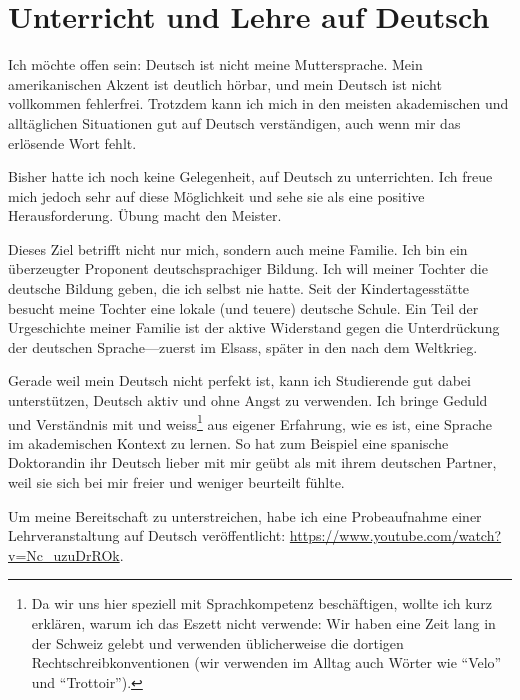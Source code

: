 
\section{Unterricht und Lehre auf Deutsch}

Ich m\"ochte offen sein: Deutsch ist nicht meine Muttersprache. Mein
amerikanischen Akzent
ist deutlich h\"orbar, und mein Deutsch ist nicht vollkommen
fehlerfrei.
%
Trotzdem kann ich mich in den meisten akademischen und allt\"aglichen
Situationen gut auf Deutsch verst\"andigen, auch wenn mir das
erl\"osende Wort fehlt.

Bisher hatte ich noch keine Gelegenheit, auf Deutsch zu
unterrichten. Ich freue mich jedoch sehr auf diese M\"oglichkeit und sehe
sie als eine positive Herausforderung.
\"Ubung macht den Meister.

Dieses Ziel betrifft nicht nur mich, sondern auch meine Familie.
Ich bin ein \"uberzeugter Proponent deutschsprachiger Bildung.
Ich will meiner Tochter die deutsche Bildung geben, die ich selbst nie
hatte.
Seit der Kindertagesst\"atte besucht meine Tochter eine lokale (und
teuere) deutsche
Schule.
Ein Teil der Urgeschichte meiner Familie ist der aktive
Widerstand gegen die Unterdr\"uckung der deutschen Sprache---zuerst im
Elsass, sp\"ater in den  nach dem Weltkrieg.

Gerade weil mein Deutsch nicht perfekt ist, kann ich Studierende gut
dabei unterst\"utzen, Deutsch aktiv und ohne Angst zu verwenden.
Ich bringe Geduld und Verst\"andnis mit und weiss\footnote{Da wir uns hier speziell mit Sprachkompetenz besch\"aftigen, wollte ich kurz erkl\"aren, warum ich das Eszett nicht verwende: Wir haben eine Zeit lang in der Schweiz gelebt und verwenden \"ublicherweise die dortigen Rechtschreibkonventionen (wir verwenden im Alltag auch W\"orter wie ``Velo'' und ``Trottoir'').} aus eigener Erfahrung,
wie es ist, eine Sprache im akademischen Kontext zu lernen.
So hat zum Beispiel eine spanische Doktorandin ihr Deutsch lieber mit mir
ge\"ubt als mit ihrem deutschen Partner, weil sie sich bei mir freier und
weniger beurteilt f\"uhlte.

Um meine Bereitschaft zu unterstreichen, habe ich eine Probeaufnahme
einer Lehrveranstaltung auf Deutsch ver\"offentlicht: \href{https://www.youtube.com/watch?v=Nc_uzuDrROk}{https://www.youtube.com/watch?v=Nc\_uzuDrROk}.


